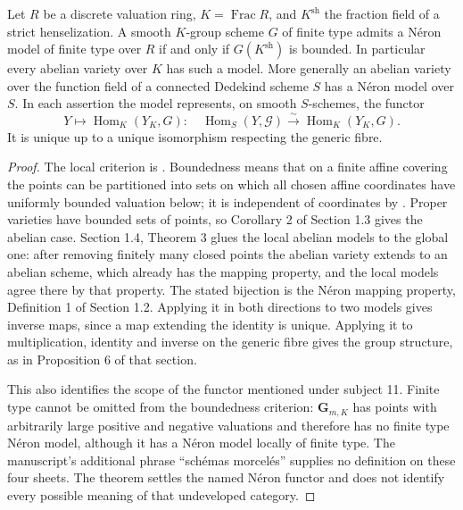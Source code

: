 \begin{theorem}\label{thm:B3-neron}
Let $R$ be a discrete valuation ring, $K=\operatorname{Frac}R$, and
$K^{\mathrm{sh}}$ the fraction field of a strict henselization.
A smooth $K$-group scheme $G$ of finite type admits a N\'eron model
of finite type over $R$ if and only if $G(K^{\mathrm{sh}})$ is
bounded. In particular every abelian variety over $K$ has such a
model. More generally an abelian variety over the function field
of a connected Dedekind scheme $S$ has a N\'eron model over $S$.
In each assertion the model represents, on smooth $S$-schemes, the
functor
\[
 Y\longmapsto\operatorname{Hom}_K(Y_K,G):\quad
 \operatorname{Hom}_S(Y,\mathcal G)
 \xrightarrow{\sim}\operatorname{Hom}_K(Y_K,G).
\]
It is unique up to a unique isomorphism respecting the generic fibre.
\end{theorem}
\begin{proof}
The local criterion is \cite[Section 1.3, Theorem 1, p.~16]{BBLR}.
Boundedness means that on a finite affine covering the points can be
partitioned into sets on which all chosen affine coordinates have
uniformly bounded valuation below; it is independent of coordinates
by \cite[Section 1.1, Propositions 3--7]{BBLR}.
Proper varieties have bounded sets of points, so Corollary 2 of
Section 1.3 gives the abelian case. Section 1.4, Theorem 3 glues the
local abelian models to the global one: after removing finitely many
closed points the abelian variety extends to an abelian scheme,
which already has the mapping property, and the local models agree
there by that property. The stated bijection is the N\'eron mapping
property, Definition 1 of Section 1.2. Applying it in both directions
to two models gives inverse maps, since a map extending the identity
is unique. Applying it to multiplication, identity and inverse on
the generic fibre gives the group structure, as in Proposition 6
of that section.

This also identifies the scope of the functor mentioned under
subject 11. Finite type cannot be omitted from the boundedness
criterion: $\mathbf G_{m,K}$ has points with arbitrarily large
positive and negative valuations and therefore has no finite type
N\'eron model, although it has a N\'eron model locally of finite type.
The manuscript's additional phrase ``sch\'emas morcel\'es'' supplies
no definition on these four sheets. The theorem settles the named
N\'eron functor and does not identify every possible meaning of that
undeveloped category.
\end{proof}

